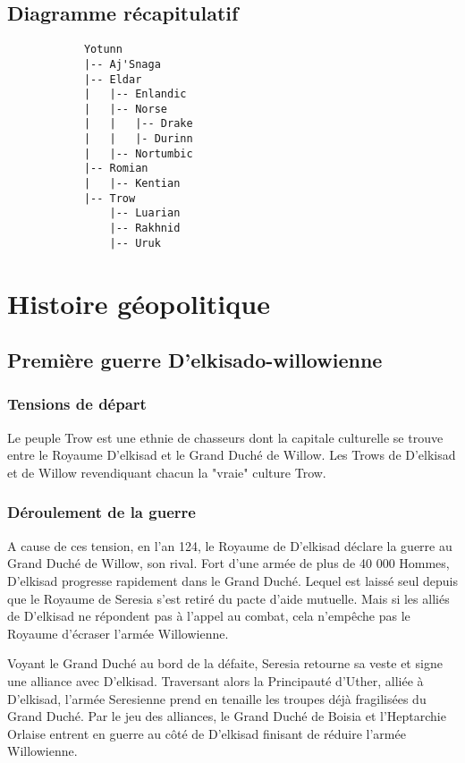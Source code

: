 \documentclass[french, a4paper, 12pt]{article}
\begin{document}
	\subsection{Diagramme récapitulatif}

		\begin{verbatim}
			Yotunn
			|-- Aj'Snaga
			|-- Eldar
			|   |-- Enlandic
			|   |-- Norse
			|   |   |-- Drake
			|   |   |- Durinn
			|   |-- Nortumbic
			|-- Romian
			|   |-- Kentian
			|-- Trow
				|-- Luarian
				|-- Rakhnid
				|-- Uruk
		\end{verbatim}

\section{Histoire géopolitique}

	\subsection{Première guerre D'elkisado-willowienne}

		\subsubsection{Tensions de départ}

		Le peuple Trow est une ethnie de chasseurs dont la capitale culturelle se trouve entre le Royaume D'elkisad et le Grand Duché de Willow. Les Trows de D'elkisad et de Willow revendiquant chacun la "vraie" culture Trow.

		\subsubsection{Déroulement de la guerre}

		A cause de ces tension, en l'an 124, le Royaume de D'elkisad déclare la guerre au Grand Duché de Willow, son rival. Fort d'une armée de plus de 40 000 Hommes, D'elkisad progresse rapidement dans le Grand Duché. Lequel est laissé seul depuis que le Royaume de Seresia s'est retiré du pacte d'aide mutuelle. Mais si les alliés de D'elkisad ne répondent pas à l'appel au combat, cela n'empêche pas le Royaume d'écraser l'armée Willowienne.

		Voyant le Grand Duché au bord de la défaite, Seresia retourne sa veste et signe une alliance avec D'elkisad. Traversant alors la Principauté d'Uther, alliée à D'elkisad, l'armée Seresienne prend en tenaille les troupes déjà fragilisées du Grand Duché. Par le jeu des alliances, le Grand Duché de Boisia et l'Heptarchie Orlaise entrent en guerre au côté de D'elkisad finisant de réduire l'armée Willowienne. 
\end{document}
